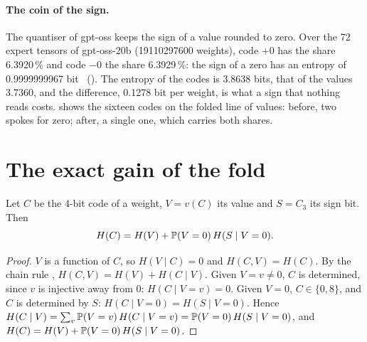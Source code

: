 \paragraph{The coin of the sign.} The quantiser of gpt-oss keeps the sign of a value rounded to zero. Over the 72 expert tensors of gpt-oss-20b (\num{19110297600} weights), code $+0$ has the share 6.3920\,\% and code $-0$ the share 6.3929\,\%: the sign of a zero has an entropy of 0.9999999967 bit \mes~(). The entropy of the codes is 3.8638 bits, that of the values 3.7360, and the difference, 0.1278 bit per weight, is what a sign that nothing reads costs.  shows the sixteen codes on the folded line of values: before, two spokes for zero; after, a single one, which carries both shares.

\begin{figure}[tbp]
\centering
\GrapheCodonRoue
{}
\label{fig:t3-codon-roue}
\end{figure}

\section{The exact gain of the fold}\label{t3cod:sec:gain}

\begin{proposition}\label{t3cod:prop:gain}
Let $C$ be the 4-bit code of a weight, $V = v(C)$ its value and $S = C_3$ its sign bit. Then
\begin{equation}\label{t3cod:eq:gain}
H(C) = H(V) + \mathbb{P}(V = 0)\, H(S \mid V = 0).
\end{equation}
\end{proposition}

\begin{proof}
$V$ is a function of $C$, so $H(V \mid C) = 0$ and $H(C, V) = H(C)$. By the chain rule \parencite{cover2006}, $H(C, V) = H(V) + H(C \mid V)$. Given $V = v \ne 0$, $C$ is determined, since $v$ is injective away from 0: $H(C \mid V = v) = 0$. Given $V = 0$, $C \in \{0, 8\}$, and $C$ is determined by $S$: $H(C \mid V = 0) = H(S \mid V = 0)$. Hence $H(C \mid V) = \sum_v \mathbb{P}(V = v)\, H(C \mid V = v) = \mathbb{P}(V = 0)\, H(S \mid V = 0)$, and $H(C) = H(V) + \mathbb{P}(V = 0)\,H(S \mid V = 0)$.
\end{proof}

